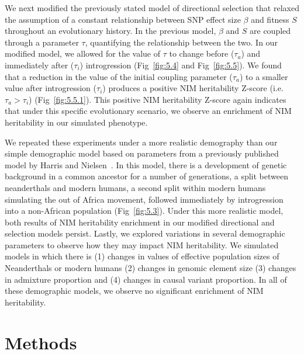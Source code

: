 We next modified the previously stated model of directional selection that relaxed the assumption of a constant relationship between SNP effect size $\beta$ and fitness $S$ throughout an evolutionary history. In the previous model, $\beta$ and $S$ are coupled through a parameter $\tau$, quantifying the relationship between the two. In our modified model, we allowed for the value of $\tau$ to change before ($\tau_a$) and immediately after ($\tau_i$) introgression ({Fig~\ref{fig:5.4} and Fig~\ref{fig:5.5}}). We found that a reduction in the value of the initial coupling parameter ($\tau_a$) to a smaller value after introgression ($\tau_i$) produces a positive NIM heritability Z-score (i.e. $\tau_a > \tau_i$) ({Fig~\ref{fig:5.5.1}}). This positive NIM heritability Z-score again indicates that under this specific evolutionary scenario, we observe an enrichment of NIM heritability in our simulated phenotype.

We repeated these experiments under a more realistic demography than our simple demographic model based on parameters from a previously published model by Harris and Nielsen~\cite{harris2016genetic}. In this model, there is a development of genetic background in a common ancestor for a number of generations, a split between neanderthals and modern humans, a second split within modern humans simulating the out of Africa movement, followed immediately by introgression into a non-African population ({Fig~\ref{fig:5.3}}). Under this more realistic model, both results of NIM heritability enrichment in our modified directional and selection models persist. Lastly, we explored variations in several demographic parameters to observe how they may impact NIM heritability. We simulated models in which there is (1) changes in values of effective population sizes of Neanderthals or modern humans (2) changes in genomic element size (3) changes in admixture proportion and (4) changes in causal variant proportion. In all of these demographic models, we observe no significant enrichment of NIM heritability. 

\section{Methods}
